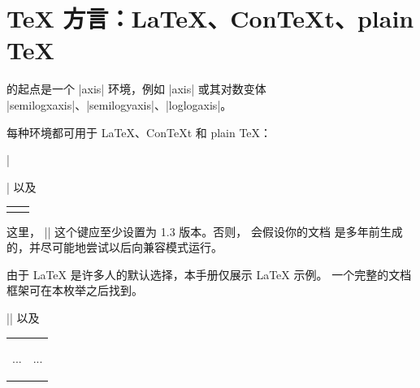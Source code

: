 
\section{\TeX{} 方言：\LaTeX{}、Con\TeX{}t、plain \TeX{}}
\label{sec:tex:dialects}

\PGFPlots{} 的起点是一个 |axis| 环境，例如 |axis| 或其对数变体
|semilogxaxis|、|semilogyaxis|、|loglogaxis|。

每种环境都可用于 \LaTeX{}、Con\TeX{}t 和 plain \TeX{}：
%
\begin{description}
        \def\HEAD{%
            \small
            \begin{tabular}{*{2}{p{4cm}}}%
        }%
    \item[\LaTeX{}:]
        |\usepackage{pgfplots} |
        以及

        {\HEAD
\begin{codeexample}
\begin{tikzpicture}
\begin{axis}
...
\end{axis}
\end{tikzpicture}
\end{codeexample}
        &
\begin{codeexample}
\begin{tikzpicture}
\begin{semilogxaxis}
...
\end{semilogxaxis}
\end{tikzpicture}
\end{codeexample}
        \\
        \end{tabular}%
        }

        这里，
        ||
        这个键应至少设置为 1.3 版本。否则，\PGFPlots{} 会假设你的文档
        是多年前生成的，并尽可能地尝试以后向兼容模式运行。

        由于 \LaTeX{} 是许多人的默认选择，本手册仅展示 \LaTeX{} 示例。
        一个完整的文档框架可在本枚举之后找到。
    \item[Con\TeX{}t:]
        |\usemodule[pgfplots] \pgfplotsset[compat=|\pgfkeysvalueof{/pgfplots/compat/mostrecent}|]|
        以及

        {\HEAD
\begin{codeexample}
\starttikzpicture
\startaxis
...
\stopaxis
\stoptikzpicture
\end{codeexample}
        &
\begin{codeexample}
\starttikzpicture
\startsemilogxaxis
...
\stopsemilogxaxis
\stoptikzpicture
\end{codeexample}
        \\
        \end{tabular}%
        }


\end{description}
